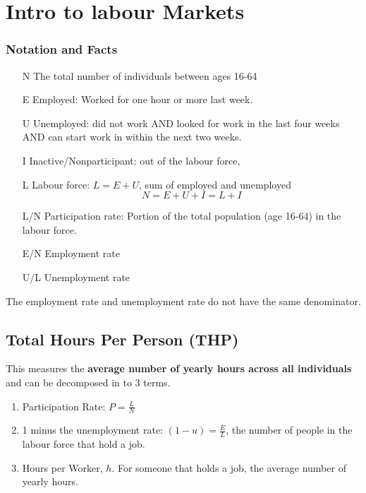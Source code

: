 \documentclass[11pt]{article}
\begin{document}
\section{Intro to labour Markets}
\begin{shaded}
\subsubsection*{Notation and Facts}

\begin{itemize}
    \item [N] The total number of individuals between ages 16-64
    \item [E] Employed: Worked for one hour or more last week.
    \item [U] Unemployed: did not work AND looked for work in the last four weeks AND can start work in within the next two weeks.
    \item [I] Inactive/Nonparticipant: out of the labour force, 
    \item [L] Labour force: $L=E+U$, sum of employed and unemployed
    \[N = E + U + I = L + I\]

    \item [L/N] Participation rate: Portion of the total population (age 16-64) in the labour force.
    \item [E/N] Employment rate 
    \item [U/L] Unemployment rate
\end{itemize}

\begin{note}
    The employment rate and unemployment rate do not have the same denominator.
\end{note}
\end{shaded}

\subsection{Total Hours Per Person (THP)}

This measures the \textbf{average number of yearly hours across all individuals} and can be decomposed in to 3 terms.
\begin{enumerate}
    \item Participation Rate: $P = \frac{L}{N}$
    \item 1 minus the unemployment rate: $(1-u) = \frac{E}{L}$, the number of people in the labour force that hold a job.
    \item Hours per Worker, $h$. For someone that holds a job, the average number of yearly hours.
\end{enumerate}
\end{document}
